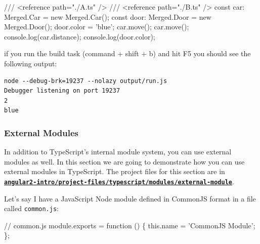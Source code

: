 \documentclass[12pt,]{article}
\newenvironment{Shaded}{}{}
\newcommand{\KeywordTok}[1]{\textcolor[rgb]{0.00,0.00,1.00}{{#1}}}
\newcommand{\DataTypeTok}[1]{{#1}}
\newcommand{\StringTok}[1]{\textcolor[rgb]{0.00,0.50,0.50}{{#1}}}
\newcommand{\CommentTok}[1]{\textcolor[rgb]{0.00,0.50,0.00}{{#1}}}
\newcommand{\FunctionTok}[1]{{#1}}
\newcommand{\VariableTok}[1]{{#1}}
\newcommand{\OperatorTok}[1]{{#1}}
\newcommand{\AttributeTok}[1]{{#1}}
\newcommand{\NormalTok}[1]{{#1}}
\begin{document}
\begin{Shaded}
\begin{Highlighting}[numbers=left,,]
\CommentTok{/// <reference path="./A.ts" />}
\CommentTok{/// <reference path="./B.ts" />}
\DataTypeTok{const} \NormalTok{car: Merged.}\FunctionTok{Car} \NormalTok{= }\KeywordTok{new} \NormalTok{Merged.}\FunctionTok{Car}\NormalTok{();}
\DataTypeTok{const} \NormalTok{door: Merged.}\FunctionTok{Door} \NormalTok{= }\KeywordTok{new} \NormalTok{Merged.}\FunctionTok{Door}\NormalTok{();}
\NormalTok{door.}\FunctionTok{color} \NormalTok{= 'blue';}
\NormalTok{car.}\FunctionTok{move}\NormalTok{();}
\NormalTok{car.}\FunctionTok{move}\NormalTok{();}
\NormalTok{console.}\FunctionTok{log}\NormalTok{(car.}\FunctionTok{distance}\NormalTok{);}
\NormalTok{console.}\FunctionTok{log}\NormalTok{(door.}\FunctionTok{color}\NormalTok{);}
\end{Highlighting}
\end{Shaded}

if you run the build task (command + shift + b) and hit F5 you should
see the following output:

\begin{verbatim}
node --debug-brk=19237 --nolazy output/run.js
Debugger listening on port 19237
2
blue
\end{verbatim}

\subsubsection{External Modules}\label{external-modules}

In addition to TypeScript's internal module system, you can use external
modules as well. In this section we are going to demonstrate how you can
use external modules in TypeScript. The project files for this section
are in
\href{https://github.com/st32lth/angular2-intro/tree/master/project-files/typescript/modules/external-module}{\textbf{\texttt{angular2-intro/project-files/typescript/modules/external-module}}}.

Let's say I have a JavaScript Node module defined in CommonJS format in
a file called \texttt{common.js}:

\begin{Shaded}
\begin{Highlighting}[numbers=left,,]
\CommentTok{// common.js}
\VariableTok{module}\NormalTok{.}\AttributeTok{exports} \OperatorTok{=} \KeywordTok{function} \NormalTok{() }\OperatorTok{\{}
  \KeywordTok{this}\NormalTok{.}\AttributeTok{name} \OperatorTok{=} \StringTok{'CommonJS Module'}\OperatorTok{;}
\OperatorTok{\};}
\end{Highlighting}
\end{Shaded}
\end{document}
